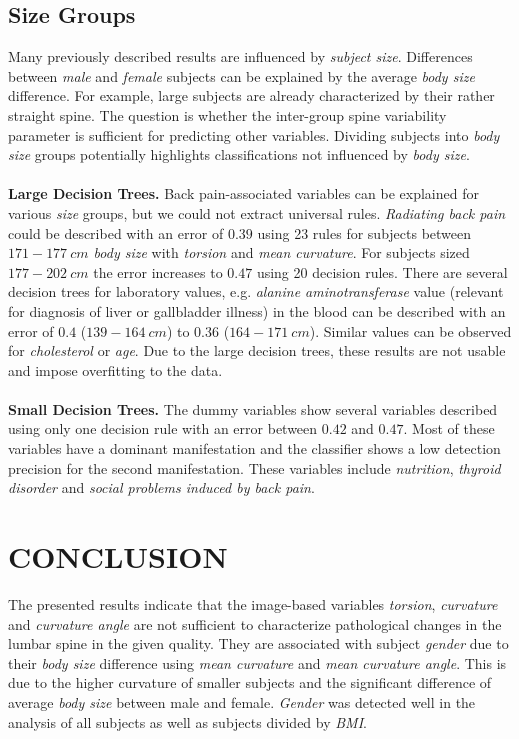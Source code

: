 \documentclass[a4paper,twoside]{style/article}
\begin{document}
\subsection{Size Groups}
Many previously described results are influenced by \emph{subject size}.
Differences between \emph{male} and \emph{female} subjects can be explained by the average \emph{body size} difference.
For example, large subjects are already characterized by their rather straight spine.
%
The question is whether the inter-group spine variability parameter is sufficient for predicting other variables.
Dividing subjects into \emph{body size} groups potentially highlights classifications not influenced by \emph{body size}.
\\\\
\noindent \textbf{Large Decision Trees.}
Back pain-associated variables can be explained for various \emph{size} groups, but we could not extract universal rules.
\emph{Radiating back pain} could be described with an error of $0.39$ using 23 rules for subjects between \emph{$171-177~cm$ body size} with \emph{torsion} and \emph{mean curvature}.
For subjects sized \emph{$177-202~cm$} the error increases to $0.47$ using 20 decision rules.
There are several decision trees for laboratory values, e.g. \emph{alanine aminotransferase} value (relevant for diagnosis of liver or gallbladder illness) in the blood can be described with an error of $0.4$ (\emph{$139-164~cm$}) to $0.36$ (\emph{$164 - 171~cm$}).
Similar values can be observed for \emph{cholesterol} or \emph{age}.
Due to the large decision trees, these results are not usable and impose overfitting to the data.
\\\\
\noindent \textbf{Small Decision Trees.}
The dummy variables show several variables described using only one decision rule with an error between $0.42$ and $0.47$.
Most of these variables have a dominant manifestation and the classifier shows a low detection precision for the second manifestation.
These variables include \emph{nutrition}, \emph{thyroid disorder} and \emph{social problems induced by back pain}.
\section{\uppercase{Conclusion}}
\label{sec:Conclusion}
\noindent The presented results indicate that the image-based variables \emph{torsion}, \emph{curvature} and \emph{curvature angle} are not sufficient to characterize pathological changes in the lumbar spine in the given quality.
They are associated with subject \emph{gender} due to their \emph{body size} difference using \emph{mean curvature} and \emph{mean curvature angle}.
This is due to the higher curvature of smaller subjects and the significant difference of average \emph{body size} between male and female.
\emph{Gender} was detected well in the analysis of all subjects as well as subjects divided by \emph{BMI}.
\end{document}
